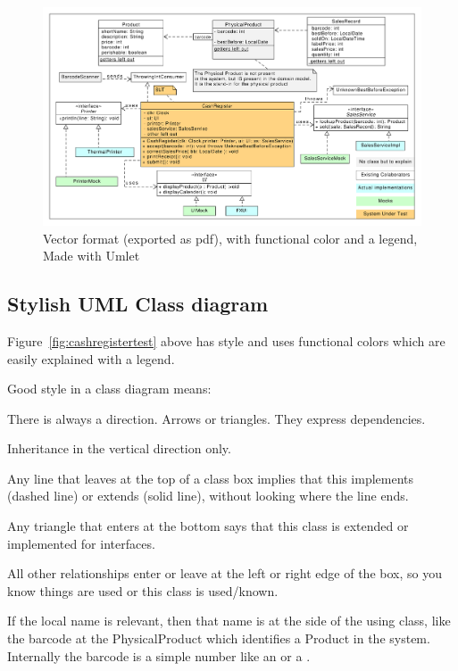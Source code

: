 \begin{figure}[htbp]
  \includegraphics[width=\linewidth]{images/perishablesales.pdf}
  \caption{\label{fig:cashregistertest}Vector format (exported as pdf), with functional color and a legend, Made with Umlet}
\end{figure}


\subsection{Stylish UML Class diagram}
\label{sec:stylish}
Figure~\vref{fig:cashregistertest} above has style and uses functional colors which are easily explained with a legend.

Good style in a class diagram means:
\begin{Itemize}
\item There is always a direction. Arrows or triangles. They express dependencies.
\item Inheritance in the vertical direction only.
  \begin{Itemize}
    \item Any line that leaves at the top of a class box implies that this
      implements (dashed line) or extends (solid line), without looking where the line ends.
    \item Any triangle that enters at the bottom says that this class is extended or implemented for interfaces.
  \end{Itemize}
  \item All other relationships enter or leave at the left or right edge of the box, so you know things are used
  or this class is used/known.
  \begin{Itemize}
  \item If the local name is relevant, then that name is at the side of the using class, like the barcode at the PhysicalProduct which identifies a Product in the system. Internally the barcode is a simple number like an  or a .
  \end{Itemize}
\end{Itemize}


